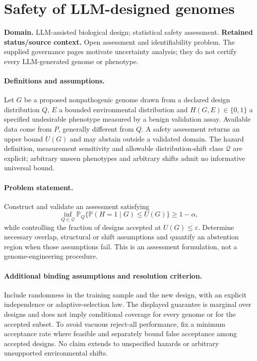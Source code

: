 \documentclass[11pt]{article}
\begin{document}
\section*{Safety of LLM-designed genomes}
\label{prob:280}
\label{rank:46}
\par\smallskip

\noindent\textbf{Domain.} LLM-assisted biological design; statistical safety assessment. \quad \textbf{Retained status/source context.} Open assessment and identifiability problem. The supplied governance pages motivate uncertainty analysis; they do not certify every LLM-generated genome or phenotype.

\paragraph{Definitions and assumptions.} Let $G$ be a proposed nonpathogenic genome drawn from a declared design distribution $Q$, $E$ a bounded environmental distribution and $H(G,E)\in\{0,1\}$ a specified undesirable phenotype measured by a benign validation assay. Available data come from $P$, generally different from $Q$. A safety assessment returns an upper bound $U(G)$ and may abstain outside a validated domain. The hazard definition, measurement sensitivity and allowable distribution-shift class $\mathcal Q$ are explicit; arbitrary unseen phenotypes and arbitrary shifts admit no informative universal bound.

\paragraph{Problem statement.} Construct and validate an assessment satisfying
\[
\inf_{Q\in\mathcal Q}\mathbb{P}_Q\{\mathbb{P}(H=1\mid G)\leq U(G)\}\geq1-\alpha,
\]
while controlling the fraction of designs accepted at $U(G)\leq\varepsilon$. Determine necessary overlap, structural or shift assumptions and quantify an abstention region when those assumptions fail. This is an assessment formulation, not a genome-engineering procedure.

\paragraph{Additional binding assumptions and resolution criterion.} Include randomness in the training sample and the new design, with an explicit independence or adaptive-selection law. The displayed guarantee is marginal over designs and does not imply conditional coverage for every genome or for the accepted subset. To avoid vacuous reject-all performance, fix a minimum acceptance rate where feasible and separately bound false acceptance among accepted designs. No claim extends to unspecified hazards or arbitrary unsupported environmental shifts.
\end{document}
